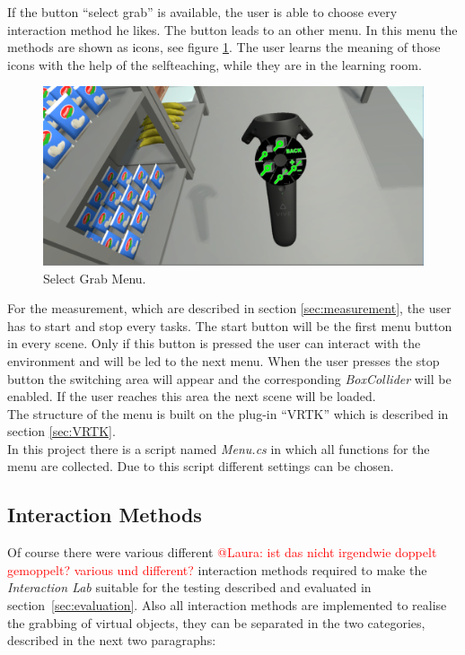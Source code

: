 If the button ``select grab'' is available, the user is able to choose every interaction method he likes. The button leads to an other menu. In this menu the methods are shown as icons, see figure \ref{fig:grabMenu}. The user learns the meaning of those icons with the help of the selfteaching, while they are in the learning room. 

\begin{figure}[H] 
	\center 
	\includegraphics[width=12cm]{Images/Menu2.PNG}
	\caption[Select Grab Menu.]{Select Grab Menu.}
	\label{fig:grabMenu}
\end{figure}

For the measurement, which are described in section \ref{sec:measurement}, the user has to start and stop every tasks. The start button will be the first menu button in every scene. Only if this button is pressed the user can interact with the environment and will be led to the next menu. When the user presses the stop button the switching area will appear and the corresponding \textit{BoxCollider} \cite{website:BoxCollider} will be enabled. If the user reaches this area the next scene will be loaded.\\
The structure of the menu is built on the plug-in ``VRTK'' which is described in section \ref{sec:VRTK}.\\
In this project there is a script named \textit{Menu.cs} in which all functions for the menu are collected. Due to this script different settings can be chosen.


\subsection{Interaction Methods}\label{sec:Interactions}
Of course there were various different \textcolor{red}{@Laura: ist das nicht irgendwie doppelt gemoppelt? various und different?} interaction methods required to make the \textit{Interaction Lab} suitable for the testing described and evaluated in section~\ref{sec:evaluation}. Also all interaction methods are implemented to realise the grabbing of virtual objects, they can be separated in the two categories, described in the next two paragraphs:

